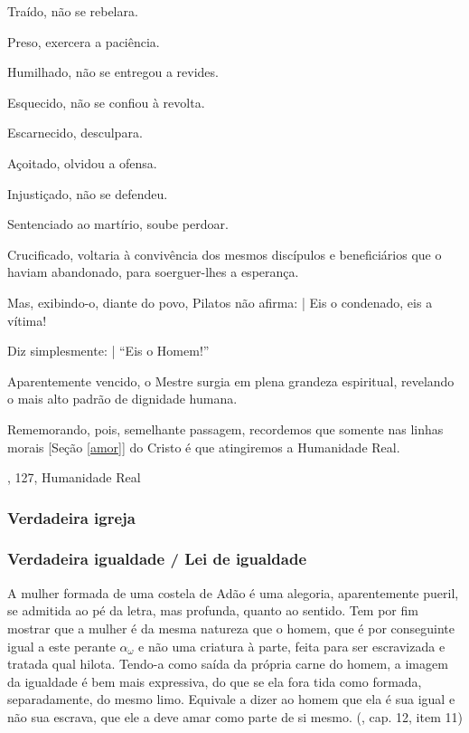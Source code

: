 \documentclass[12pt,a4paper]{article}
\begin{document}
				Tra\'ido, n\~ao se rebelara.

				Preso, exercera a paci\^encia.

				Humilhado, n\~ao se entregou a revides.

				Esquecido, n\~ao se confiou \`a revolta.

				Escarnecido, desculpara.

				A\c{c}oitado, olvidou a ofensa.

				Injusti\c{c}ado, n\~ao se defendeu.

				Sentenciado ao mart\'irio, soube perdoar.

				Crucificado, voltaria \`a conviv\^encia dos mesmos disc\'ipulos e benefici\'arios que o haviam abandonado, para soerguer-lhes a esperan\c{c}a.

				Mas, exibindo-o, diante do povo, Pilatos n\~ao afirma: | Eis o condenado, eis a v\'itima!

				Diz simplesmente: | \textquotedblleft Eis o Homem!\textquotedblright

				Aparentemente vencido, o Mestre surgia em plena grandeza espiritual, revelando o mais alto padr\~ao de dignidade humana.

				Rememorando, pois, semelhante passagem, recordemos que somente nas linhas morais [Se\c{c}\~ao \ref{amor}] do Cristo \'e que atingiremos a Humanidade Real.

				\cite{fonteViva}, 127, Humanidade Real

			\subsubsection{Verdadeira igreja}
			\begin{flushright}
			\end{flushright}

                        \cite{igreja}

			\subsubsection{Verdadeira igualdade / Lei de igualdade}\label{leiIgualdade}
			\begin{flushright}
			\end{flushright}

				A mulher formada de uma costela de Ad\~ao \'e uma alegoria, aparentemente pueril, se admitida ao p\'e da letra, mas profunda, quanto ao sentido. Tem por fim mostrar que a mulher \'e da mesma natureza que o homem, que \'e por conseguinte igual a este perante $ \alpha_\omega $ e n\~ao uma criatura \cite{criatura} \`a parte, feita para ser escravizada e tratada qual hilota. Tendo-a como sa\'ida da pr\'opria carne do homem, a imagem da igualdade \'e bem mais expressiva, do que se ela fora tida como formada, separadamente, do mesmo limo. Equivale a dizer ao homem que ela \'e sua igual e n\~ao sua escrava, que ele a deve amar como parte de si mesmo. (\cite{genese}, cap. 12, item 11)
\end{document}
